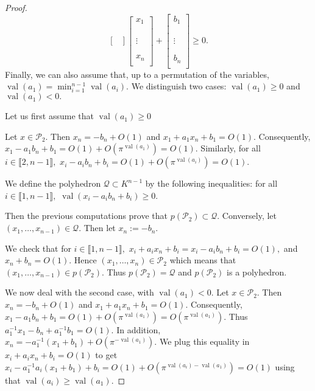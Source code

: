 \documentclass[a4paper,12pt]{article}
\newcommand{\PP}{\mathcal{P}}
\newcommand{\Qc}{\mathcal{Q}}
\DeclareMathOperator{\val}{val}
\begin{document}
\begin{proof}
\[\begin{bmatrix}
\end{bmatrix} \begin{bmatrix} x_1 \\ \\  \\ \\ \vdots \\  \\ \\ x_n \\ \end{bmatrix} + \begin{bmatrix} b_1 \\ \\ \\  \\ \vdots  \\ \\ \\ b_n \\ \end{bmatrix}  \geq 0.\]
Finally, we can also assume that, up to a permutation of the variables, $\val(a_1)= \min_{i=1}^{n-1} \val(a_i).$
We distinguish two cases: $\val(a_1) \geq 0$ and $\val(a_1)<0.$

Let us first assume that $\val(a_1) \geq 0$

Let $x \in \PP_2$.
Then $x_n=-b_n+O(1)$
and $x_1+a_1 x_n+b_1=O(1).$
Consequently, $x_1-a_1 b_n +b_1=O(1)+O(\pi^{\val(a_1)})=O(1).$
Similarly, for all $i \in \llbracket 2,n-1 \rrbracket,$
$x_i-a_ib_n+b_i=O(1)+O(\pi^{\val(a_i)})=O(1).$

We define the polyhedron $\Qc \subset K^{n-1}$ by the following inequalities:
 for all $i \in \llbracket 1,n-1 \rrbracket,$
$\val(x_i-a_ib_n+b_i) \geq 0.$

Then the previous computations prove that $p(\PP_2)\subset \Qc.$
Conversely, let $(x_1,\dots,x_{n-1}) \in \Qc.$
Then let $x_n := -b_n.$

We check that for $i \in \llbracket 1,n-1 \rrbracket,$
$x_i+a_ix_n+b_i=x_i-a_ib_n+b_i=O(1),$
and $x_n+b_n=O(1)$. Hence $(x_1,\dots,x_n) \in \PP_2$
which means that $(x_1,\dots,x_{n-1}) \in p(\PP_2).$
Thus $p(\PP_2)= \Qc$ and $p(\PP_2)$ is a polyhedron.

We now deal with the second case, with $\val(a_1)<0.$
Let $x \in \PP_2$.
Then $x_n=-b_n+O(1)$
and $x_1+a_1 x_n+b_1=O(1).$
Consequently, $x_1-a_1 b_n +b_1=O(1)+O(\pi^{\val(a_1)})=O(\pi^{\val(a_1)}).$
Thus $a_1^{-1}x_1- b_n +a_1^{-1}b_1=O(1)$.
In addition, $x_n=-a_1^{-1}(x_1+b_1)+O(\pi^{-\val(a_1)}).$
We plug this equality in 
$x_i+a_i x_n+b_i=O(1)$ to get
$x_i-a_1^{-1}a_i(x_1+b_1)+b_i=O(1)+O(\pi^{\val(a_i)-\val(a_1)})=O(1)$
using that $\val(a_i) \geq \val (a_1).$


\end{proof}
\end{document}
